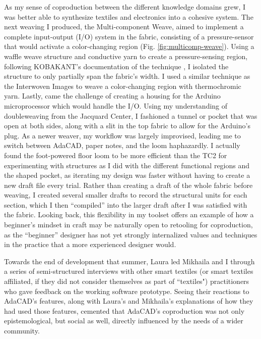 As my sense of coproduction between the different knowledge domains grew, I was better able to synthesize textiles and electronics into a cohesive system. The next weaving I produced, the Multi-component Weave, aimed to implement a complete input-output (I/O) system in the fabric, consisting of a pressure-sensor that would activate a color-changing region (Fig. \ref{fig:multicomp-weave}). Using a waffle weave structure and conductive yarn to create a pressure-sensing region, following KOBAKANT's documentation of the technique \cite{satomi_woven_2015}, I isolated the structure to only partially span the fabric's width. I used a similar technique as the Interwoven Images to weave a color-changing region with thermochromic yarn. Lastly, came the challenge of creating a housing for the Arduino microprocessor which would handle the I/O. Using my understanding of doubleweaving from the Jacquard Center, I fashioned a tunnel or pocket that was open at both sides, along with a slit in the top fabric to allow for the Arduino's plug. As a newer weaver, my workflow was largely improvised, leading me to switch between AdaCAD, paper notes, and the loom haphazardly. I actually found the foot-powered floor loom to be more efficient than the TC2 for experimenting with structures as I did with the different functional regions and the shaped pocket, as iterating my design was faster without having to create a new draft file every trial. Rather than creating a draft of the whole fabric before weaving, I created several smaller drafts to record the structural units for each section, which I then ``compiled'' into the larger draft after I was satisfied with the fabric. Looking back, this flexibility in my toolset offers an example of how a beginner's mindset in craft may be naturally open to retooling for coproduction, as the ``beginner'' designer has not yet strongly internalized values and techniques in the practice that a more experienced designer would.

Towards the end of development that summer, Laura led Mikhaila and I through a series of semi-structured interviews with other smart textiles (or smart textiles affiliated, if they did not consider themselves as part of ``textiles") practitioners who gave feedback on the working software prototype. Seeing their reactions to AdaCAD's features, along with Laura's and Mikhaila's explanations of how they had used those features, cemented that AdaCAD's coproduction was not only epistemological, but social as well, directly influenced by the needs of a wider community. 

